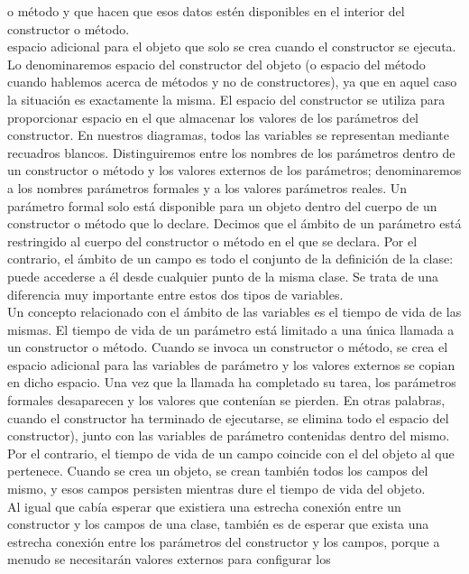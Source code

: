 \documentclass[11pt,a4paper]{article}
\begin{document}
	o método y que hacen que esos datos estén disponibles en el interior del constructor o
	método.\\
	espacio adicional para el objeto que solo se crea cuando el constructor se ejecuta.
	Lo denominaremos espacio del constructor del objeto (o espacio del método cuando hablemos
	acerca de métodos y no de constructores), ya que en aquel caso la situación es exactamente la
	misma. El espacio del constructor se utiliza para proporcionar espacio en el que almacenar los
	valores de los parámetros del constructor. En nuestros diagramas, todos las variables se representan
	mediante recuadros blancos. Distinguiremos entre los nombres de los parámetros dentro de un constructor o método y los valores
	externos de los parámetros; denominaremos a los nombres parámetros formales y a los valores
	parámetros reales. Un parámetro formal solo está disponible para un objeto dentro del cuerpo de un constructor o
	método que lo declare. Decimos que el ámbito de un parámetro está restringido al cuerpo del
	constructor o método en el que se declara. Por el contrario, el ámbito de un campo es todo el conjunto
	de la definición de la clase: puede accederse a él desde cualquier punto de la misma clase.
	Se trata de una diferencia muy importante entre estos dos tipos de variables.\\
	Un concepto relacionado con el ámbito de las variables es el tiempo de vida de las mismas.
	El tiempo de vida de un parámetro está limitado a una única llamada a un constructor o método.
	Cuando se invoca un constructor o método, se crea el espacio adicional para las variables de parámetro
	y los valores externos se copian en dicho espacio. Una vez que la llamada ha completado su
	tarea, los parámetros formales desaparecen y los valores que contenían se pierden. En otras palabras,
	cuando el constructor ha terminado de ejecutarse, se elimina todo el espacio del constructor),
	junto con las variables de parámetro contenidas dentro del mismo.\\
	Por el contrario, el tiempo de vida de un campo coincide con el del objeto al que pertenece.
	Cuando se crea un objeto, se crean también todos los campos del mismo, y esos campos persisten
	mientras dure el tiempo de vida del objeto.\\
	Al igual que cabía esperar que existiera una estrecha conexión entre un constructor y los campos
	de una clase, también es de esperar que exista una estrecha conexión entre los parámetros del
	constructor y los campos, porque a menudo se necesitarán valores externos para configurar los
\end{document}
